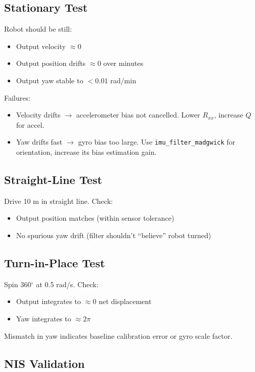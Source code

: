 \documentclass[11pt,a4paper]{article}
\begin{document}
\subsection{Stationary Test}

Robot should be still:
\begin{itemize}
\item Output velocity $\approx 0$
\item Output position drifts $\approx 0$ over minutes
\item Output yaw stable to $< 0.01$ rad/min
\end{itemize}

Failures:
\begin{itemize}
\item Velocity drifts $\to$ accelerometer bias not cancelled. Lower $R_{\dot{x}\dot{x}}$, increase $Q$ for accel.
\item Yaw drifts fast $\to$ gyro bias too large. Use \texttt{imu\_filter\_madgwick} for orientation, increase its bias estimation gain.
\end{itemize}

\subsection{Straight-Line Test}

Drive 10 m in straight line. Check:
\begin{itemize}
\item Output position matches (within sensor tolerance)
\item No spurious yaw drift (filter shouldn't ``believe'' robot turned)
\end{itemize}

\subsection{Turn-in-Place Test}

Spin 360$^\circ$ at 0.5 rad/s. Check:
\begin{itemize}
\item Output integrates to $\approx 0$ net displacement
\item Yaw integrates to $\approx 2\pi$
\end{itemize}

Mismatch in yaw indicates baseline calibration error or gyro scale factor.

\subsection{NIS Validation}
\end{document}
